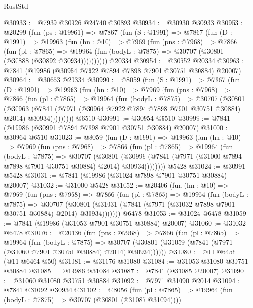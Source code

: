 \begin{lexlean}{RustStd}
\begin{coremodule}
{\begin{coremodule}
{{{{{{{{{{{{{{{{{{{{{{{{{{{{{{{{{{{{{{{{{{{{{{{{{{{{{{@30933 := @7939 @30926 @24740 @30893
@30934 := @30930 @30933
@30953 := @20299
    (fun (ps : @19961) =>
    @7867
      (fun (S : @1991) =>
      @7867
        (fun (D : @1991) =>
        @19963
          (fun (hn : @10) =>
          @7969
            (fun (pns : @7968) =>
            @7866
              (fun (pl : @7865) =>
              @19964 (fun (bodyL : @7875) => @30707 (@30801 (@30888 (@30892 @30934))))))))))
    @20334
@30954 := @30652 @20334
@30963 := @7841 (@19986 (@30954 @7922 @7894 @7898 @7901 @30751 @30884) @20007)
@30964 := @30663 @20334
@30990 := @8059
    (fun (S : @1991) =>
    @7867
      (fun (D : @1991) =>
      @19963
        (fun (hn : @10) =>
        @7969
          (fun (pns : @7968) =>
          @7866
            (fun (pl : @7865) =>
            @19964
              (fun (bodyL : @7875) =>
              @30707
                (@30801
                  (@30963
                    (@7841
                      (@7971 (@30964 @7922 @7894 @7898 @7901 @30751 @30884) @2014)
                      @30934)))))))))
    @6510
@30991 := @30954 @6510
@30999 := @7841 (@19986 (@30991 @7894 @7898 @7901 @30751 @30884) @20007)
@31000 := @30964 @6510
@31023 := @8059
    (fun (D : @1991) =>
    @19963
      (fun (hn : @10) =>
      @7969
        (fun (pns : @7968) =>
        @7866
          (fun (pl : @7865) =>
          @19964
            (fun (bodyL : @7875) =>
            @30707
              (@30801
                (@30999 (@7841 (@7971 (@31000 @7894 @7898 @7901 @30751 @30884) @2014) @30934))))))))
    @5428
@31024 := @30991 @5428
@31031 := @7841 (@19986 (@31024 @7898 @7901 @30751 @30884) @20007)
@31032 := @31000 @5428
@31052 := @20406
    (fun (hn : @10) =>
    @7969
      (fun (pns : @7968) =>
      @7866
        (fun (pl : @7865) =>
        @19964
          (fun (bodyL : @7875) =>
          @30707
            (@30801 (@31031 (@7841 (@7971 (@31032 @7898 @7901 @30751 @30884) @2014) @30934)))))))
    @6478
@31053 := @31024 @6478
@31059 := @7841 (@19986 (@31053 @7901 @30751 @30884) @20007)
@31060 := @31032 @6478
@31076 := @20436
    (fun (pns : @7968) =>
    @7866
      (fun (pl : @7865) =>
      @19964
        (fun (bodyL : @7875) =>
        @30707 (@30801 (@31059 (@7841 (@7971 (@31060 @7901 @30751 @30884) @2014) @30934))))))
@31080 := @11 @6455 (@11 @6464 @50)
@31081 := @31076 @31080
@31084 := @31053 @31080 @30751 @30884
@31085 := @19986 @31084
@31087 := @7841 (@31085 @20007)
@31090 := @31060 @31080 @30751 @30884
@31092 := @7971 @31090 @2014
@31094 := @7841 @31092 @30934
@31102 := @8056
    (fun (pl : @7865) => @19964 (fun (bodyL : @7875) => @30707 (@30801 (@31087 @31094))))
}}}}}}}}}}}}}}}}}}}}}}}}}}}}}}}}}}}}}}}}}}}}}}}}}}}}}}
\end{coremodule}}
\end{coremodule}
\end{lexlean}
